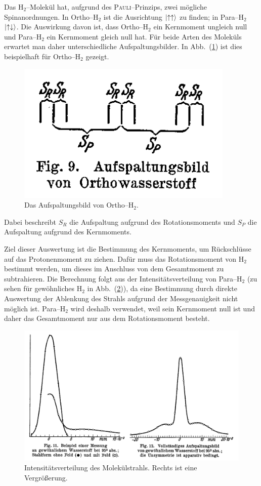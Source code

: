 \documentclass[sn-mathphys-num,iicol]{sn-jnl}
\theoremstyle{thmstyleone}
\theoremstyle{thmstyletwo}
\theoremstyle{thmstylethree}
\begin{document}
Das $\text{H}_2$--Molekül hat, aufgrund des \textsc{Pauli}--Prinzips, zwei mögliche Spinanordnungen.
In Ortho--$\text{H}_2$ ist die Ausrichtung $\ket{\uparrow\uparrow}$ zu finden; in Para--$\text{H}_2$ $\ket{\uparrow\downarrow}$.
Die Auswirkung davon ist, dass Ortho--$\text{H}_2$ ein Kernmoment ungleich null und Para--$\text{H}_2$ ein Kernmoment gleich null hat.
Für beide Arten des Moleküls erwartet man daher unterschiedliche Aufspaltungsbilder.
In Abb.\ (\ref{fig:ortho_aufspaltung}) ist dies beispielhaft für Ortho--$\text{H}_2$ gezeigt. 
\begin{figure}[h]
        \centering
        \includegraphics[width=.3\textwidth]{../vortrag/prosi_aufspaltungsbild_orthowasserstoff.png}
        \caption{Das Aufspaltungsbild von Ortho--$\text{H}_2$.\cite{FrischStern1933}} \label{fig:ortho_aufspaltung}
\end{figure}
Dabei beschreibt $S_R$ die Aufspaltung aufgrund des Rotationsmoments und $S_P$ die Aufspaltung aufgrund des Kernmoments.

Ziel dieser Auswertung ist die Bestimmung des Kernmoments, um Rückschlüsse auf das Protonenmoment zu ziehen.
Dafür muss das Rotationsmoment von $\text{H}_2$ bestimmt werden, um dieses im Anschluss von dem Gesamtmoment zu subtrahieren.
Die Berechnung folgt aus der Intensitätsverteilung von Para--$\text{H}_2$ (zu sehen für gewöhnliches $\text{H}_2$ in Abb.\ (\ref{fig:graph})), da eine Bestimmung durch direkte Auswertung der Ablenkung des Strahls aufgrund der Messgenauigkeit nicht möglich ist.
Para--$\text{H}_2$ wird deshalb verwendet, weil sein Kernmoment null ist und daher das Gesamtmoment nur aus dem Rotationsmoment besteht.
\begin{figure}[h]
        \centering
        \includegraphics[width=.5\textwidth]{../vortrag/prosi_frisch_stern_auswertung_graph.png}
        \caption{Intensitätsverteilung des Molekülstrahls. Rechts ist eine Vergrößerung.\cite{FrischStern1933}} \label{fig:graph}
\end{figure}
\end{document}
